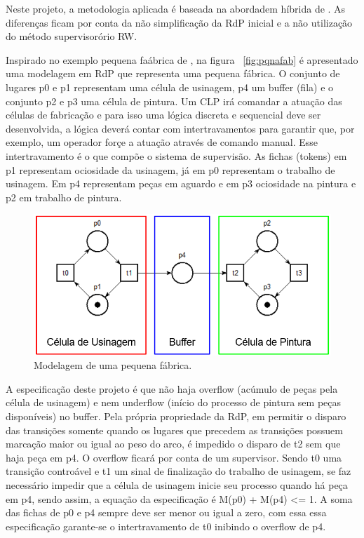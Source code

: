 Neste projeto, a metodologia aplicada \'e baseada na abordadem h\'ibrida de \cite{UzamWonham2005}. As diferen\c{c}as ficam por conta da n\~ao simplifica\c{c}\~ao da RdP inicial e a n\~ao utiliza\c{c}\~ao do m\'etodo supervisor\'orio RW.

Inspirado no exemplo pequena fa\'abrica de \cite{apostilacury}, na figura ~\ref{fig:pqnafab} \'e apresentado uma modelagem em RdP que representa uma pequena f\'abrica. O conjunto de lugares p0 e p1 representam uma c\'elula de usinagem, p4 um buffer (fila) e o conjunto p2 e p3 uma c\'elula de pintura. Um CLP ir\'a comandar a atua\c{c}\~ao das c\'elulas de fabrica\c{c}\~ao e para isso uma l\'ogica discreta e sequencial deve ser desenvolvida, a l\'ogica dever\'a contar com intertravamentos para garantir que, por exemplo, um operador for\c{c}e a atua\c{c}\~ao atrav\'es de comando manual. Esse intertravamento \'e o que comp\~oe o sistema de supervis\~ao.
As fichas (tokens) em p1 representam ociosidade da usinagem, j\'a em p0 representam o trabalho de usinagem. Em p4 representam pe\c{c}as em aguardo e em p3 ociosidade na pintura e p2 em trabalho de pintura.\

\begin{figure}[!htb]
	\caption[Modelagem de uma pequena f\'abrica.]{Modelagem de uma pequena f\'abrica.}
	\label{fig:pqnafabrica}
	\includegraphics[width=16cm]{./figuras/PQNAFAB.png}\centering
\end{figure}

A especifica\c{c}\~ao deste projeto \'e que n\~ao haja overflow (ac\'umulo de pe\c{c}as pela c\'elula de usinagem) e nem underflow (in\'icio do processo de pintura sem pe\c{c}as dispon\'iveis) no buffer. Pela pr\'opria propriedade da RdP, em permitir o disparo das transi\c{c}\~oes somente quando os lugares que precedem as transi\c{c}\~oes possuem marca\c{c}\~ao maior ou igual ao peso do arco, \'e impedido o disparo de t2 sem que haja pe\c{c}a em p4. O overflow ficar\'a por conta de um supervisor. Sendo t0 uma transi\c{c}\~ao contro\'avel e t1 um sinal de finaliza\c{c}\~ao do trabalho de usinagem, se faz necess\'ario impedir que a c\'elula de usinagem inicie seu processo quando h\'a pe\c{c}a em p4, sendo assim, a equa\c{c}\~ao da especifica\c{c}\~ao \'e M(p0) + M(p4) <= 1. A soma das fichas de p0 e p4 sempre deve ser menor ou igual a zero, com essa essa especifica\c{c}\~ao garante-se o intertravamento de t0 inibindo o overflow de p4.




